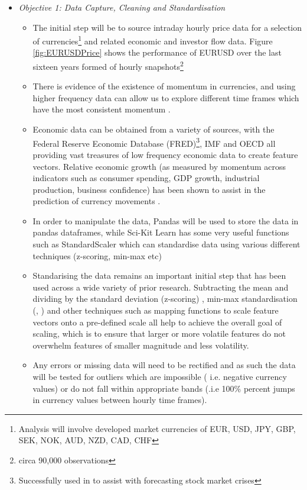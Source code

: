 \documentclass[12pt, a4paper]{article}
\begin{document}
\begin{itemize}
\item \textit{Objective 1: Data Capture, Cleaning and Standardisation}
\begin{itemize}
\item The initial step will be to source intraday hourly price data for a selection of currencies\footnote{Analysis will involve developed market currencies of EUR, USD, JPY, GBP, SEK, NOK, AUD, NZD, CAD, CHF} and related economic and investor flow data. Figure \ref{fig:EURUSDPrice} shows the performance of EURUSD over the last sixteen years formed of hourly snapshots\footnote{circa 90,000 observations}
\item There is evidence of the existence of momentum in currencies, and using higher frequency data can allow us to explore different time frames which have the most consistent momentum \cite{Filippou2017}. 
\item Economic data can be obtained from a variety of sources, with the Federal Reserve Economic Database (FRED)\footnote{Successfully used in \cite{Chatzis2018} to assist with forecasting stock market crises}, IMF and OECD all providing vast treasures of low frequency economic data to create feature vectors. Relative economic growth (as measured by momentum across indicators such as consumer spending, GDP growth, industrial production, business confidence) has been shown to assist in the prediction of currency movements \cite{Dahlquist2015}.  
\item In order to manipulate the data, Pandas will be used to store the data in pandas dataframes, while Sci-Kit Learn has some very useful functions such as StandardScaler which can standardise data using various different techniques (z-scoring, min-max etc)
\item Standarising the data remains an important initial step that has been used across a wide variety of prior research. Subtracting the mean and dividing by the standard deviation (z-scoring) \cite{Fischer2018}, min-max standardisation (\cite{Gunduz2017}, \cite{Kumar2006})  and other techniques such as  mapping functions to scale feature vectors onto a pre-defined scale \cite{Kara2011} \cite{Wang2014} \cite{Patel2015} all help to achieve the overall goal of scaling, which is to ensure that larger or more volatile features do not overwhelm features of smaller magnitude and less volatility. 
\item Any errors or missing data will need to be rectified and as such the data will be tested for outliers which are impossible ( i.e. negative currency values) or do not fall within appropriate bands (.i.e 100\% percent jumps in currency values between hourly time frames). 

\end{itemize}
\end{itemize}
\end{document}
